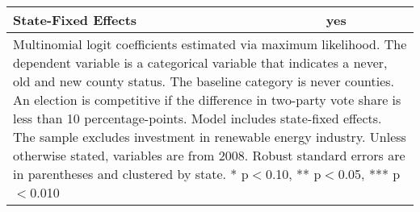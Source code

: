 \begin{table}[!htbp]
\begin{tabular}{l*{2}{c}}
State-Fixed Effects &         yes   &               \\
\hline\hline
\multicolumn{3}{p{\linewidth}}{\footnotesize Multinomial logit coefficients estimated via maximum likelihood. The dependent variable is a categorical variable that indicates a never, old and new county status. The baseline category is never counties. An election is competitive if the difference in two-party vote share is less than 10 percentage-points. Model includes state-fixed effects. The sample excludes investment in renewable energy industry. Unless otherwise stated, variables are from 2008. Robust standard errors are in parentheses and clustered by state. * p$<$0.10, ** p$<$0.05, *** p$<$0.010}\\
\end{tabular}
\end{table}
